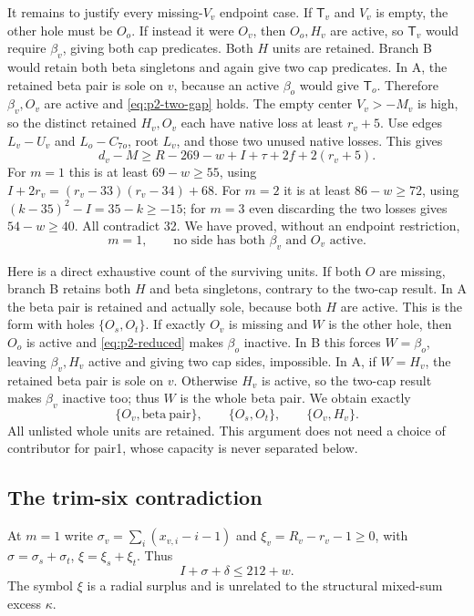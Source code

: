 \documentclass[11pt,letterpaper]{article}
\theoremstyle{definition}\newtheorem{definition}[theorem]{Definition}
\begin{document}
It remains to justify every missing-$V_v$ endpoint case. If $\mathsf T_v$
and $V_v$ is empty, the other hole must be $O_o$. If instead it were
$O_v$, then $O_o,H_v$ are active, so $\mathsf T_v$ would require
$\beta_v$, giving both cap predicates. Both $H$ units are retained.
Branch B would retain both beta singletons and again give two cap
predicates. In A, the retained beta pair is sole on $v$, because an
active $\beta_o$ would give $\mathsf T_o$. Therefore $\beta_v,O_v$ are
active and \eqref{eq:p2-two-gap} holds.
The empty center $V_v>-M_v$ is high, so the distinct retained $H_v,O_v$
each have native loss at least $r_v+5$. Use edges $L_v-U_v$ and
$L_o-C_{7o}$, root $L_v$, and those two unused native losses. This gives
\[
 d_v-M\ge R-269-w+I+\tau+2f+2(r_v+5).
\]
For $m=1$ this is at least $69-w\ge55$, using
$I+2r_v=(r_v-33)(r_v-34)+68$. For $m=2$ it is at least $86-w\ge72$,
using $(k-35)^2-I=35-k\ge-15$; for $m=3$ even discarding the two losses
gives $54-w\ge40$. All contradict 32.
We have proved, without an endpoint restriction,
\begin{equation}
 m=1,\qquad \text{no side has both }\beta_v\text{ and }O_v\text{ active}.
 \label{eq:p2-reduced}
\end{equation}

Here is a direct exhaustive count of the surviving units. If both $O$
are missing, branch B retains both $H$ and beta singletons, contrary to
the two-cap result. In A the beta pair is retained and actually sole,
because both $H$ are active. This is the form with holes $\{O_s,O_t\}$.
If exactly $O_v$ is missing and $W$ is the other hole, then $O_o$ is
active and \eqref{eq:p2-reduced} makes $\beta_o$ inactive.
In B this forces $W=\beta_o$, leaving $\beta_v,H_v$ active and giving two
cap sides, impossible. In A, if $W=H_v$, the retained beta pair is sole
on $v$. Otherwise $H_v$ is active, so the two-cap result makes
$\beta_v$ inactive too; thus $W$ is the whole beta pair. We obtain exactly
\[
 \{O_v,\mathrm{beta\ pair}\},\qquad
 \{O_s,O_t\},\qquad \{O_v,H_v\}.
                                                        \tag{P2-forms}
\]
All unlisted whole units are retained. This argument does not need a
choice of contributor for pair1, whose capacity is never separated below.

\subsection{The trim-six contradiction}
At $m=1$ write
$\sigma_v=\sum_i(x_{v,i}-i-1)$ and
$\xi_v=R_v-r_v-1\ge0$, with $\sigma=\sigma_s+\sigma_t$,
$\xi=\xi_s+\xi_t$. Thus
\begin{equation}
 I+\sigma+\delta\le212+w.                         \label{eq:p2-finalmass}
\end{equation}
The symbol $\xi$ is a radial surplus and is unrelated to the structural
mixed-sum excess $\kappa$.
\end{document}
